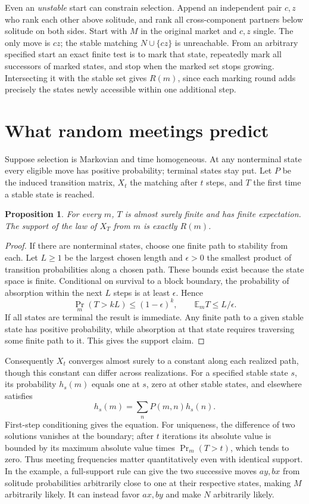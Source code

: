\documentclass[11pt]{article}
\newtheorem{proposition}{Proposition}
\begin{document}
Even an \emph{unstable} start can constrain selection. Append an independent pair \(c,z\) who rank each other above solitude, and rank all cross-component partners below solitude on both sides. Start with \(M\) in the original market and \(c,z\) single. The only move is \(cz\); the stable matching \(N\cup\{cz\}\) is unreachable. From an arbitrary specified start an exact finite test is to mark that state, repeatedly mark all successors of marked states, and stop when the marked set stops growing. Intersecting it with the stable set gives \(R(m)\), since each marking round adds precisely the states newly accessible within one additional step.

\section{What random meetings predict}

Suppose selection is Markovian and time homogeneous. At any nonterminal state every eligible move has positive probability; terminal states stay put. Let \(P\) be the induced transition matrix, \(X_t\) the matching after \(t\) steps, and \(T\) the first time a stable state is reached.

\begin{proposition}
For every \(m\), \(T\) is almost surely finite and has finite expectation. The support of the law of \(X_T\) from \(m\) is exactly \(R(m)\).
\end{proposition}

\begin{proof}
If there are nonterminal states, choose one finite path to stability from each. Let \(L\geq1\) be the largest chosen length and \(\epsilon>0\) the smallest product of transition probabilities along a chosen path. These bounds exist because the state space is finite. Conditional on survival to a block boundary, the probability of absorption within the next \(L\) steps is at least \(\epsilon\). Hence
\[
 \Pr_m(T>kL)\leq(1-\epsilon)^k,\qquad
 \mathbb E_m T\leq L/\epsilon .
\]
If all states are terminal the result is immediate. Any finite path to a given stable state has positive probability, while absorption at that state requires traversing some finite path to it. This gives the support claim.
\end{proof}

Consequently \(X_t\) converges almost surely to a constant along each realized path, though this constant can differ across realizations. For a specified stable state \(s\), its probability \(h_s(m)\) equals one at \(s\), zero at other stable states, and elsewhere satisfies
\[
 h_s(m)=\sum_n P(m,n)h_s(n).
\]
First-step conditioning gives the equation. For uniqueness, the difference of two solutions vanishes at the boundary; after \(t\) iterations its absolute value is bounded by its maximum absolute value times \(\Pr_m(T>t)\), which tends to zero. Thus meeting frequencies matter quantitatively even with identical support. In the example, a full-support rule can give the two successive moves \(ay,bx\) from solitude probabilities arbitrarily close to one at their respective states, making \(M\) arbitrarily likely. It can instead favor \(ax,by\) and make \(N\) arbitrarily likely.
\end{document}
